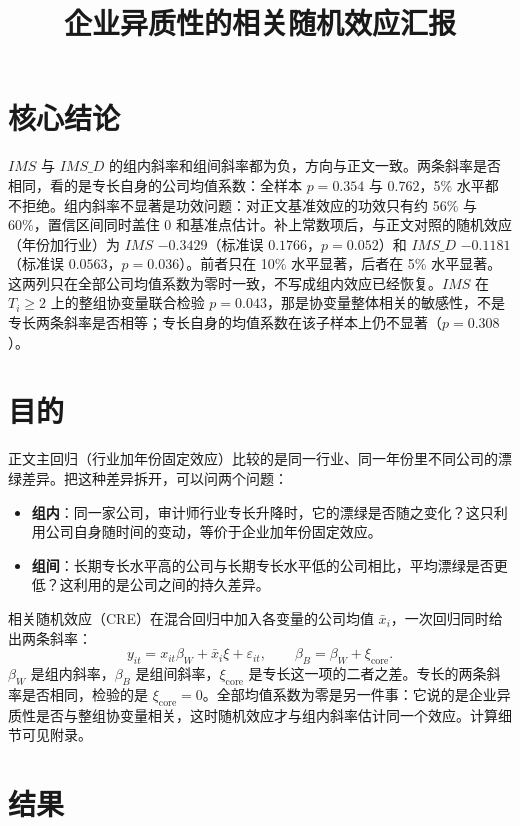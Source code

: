 \documentclass[12pt,a4paper]{article}
\title{企业异质性的相关随机效应汇报}
\author{}
\date{}
\begin{document}
\maketitle

\section{核心结论}

$IMS$ 与 $IMS\_D$ 的组内斜率和组间斜率都为负，方向与正文一致。两条斜率是否相同，看的是专长自身的公司均值系数：全样本 $p=0.354$ 与 $0.762$，5\% 水平都不拒绝。组内斜率不显著是功效问题：对正文基准效应的功效只有约 56\% 与 60\%，置信区间同时盖住 0 和基准点估计。补上常数项后，与正文对照的随机效应（年份加行业）为 $IMS$ $-0.3429$（标准误 $0.1766$，$p=0.052$）和 $IMS\_D$ $-0.1181$（标准误 $0.0563$，$p=0.036$）。前者只在 10\% 水平显著，后者在 5\% 水平显著。这两列只在全部公司均值系数为零时一致，不写成组内效应已经恢复。$IMS$ 在 $T_i\ge 2$ 上的整组协变量联合检验 $p=0.043$，那是协变量整体相关的敏感性，不是专长两条斜率是否相等；专长自身的均值系数在该子样本上仍不显著（$p=0.308$）。

\section{目的}

正文主回归（行业加年份固定效应）比较的是同一行业、同一年份里不同公司的漂绿差异。把这种差异拆开，可以问两个问题：
\begin{itemize}
\item \textbf{组内}：同一家公司，审计师行业专长升降时，它的漂绿是否随之变化？这只利用公司自身随时间的变动，等价于企业加年份固定效应。
\item \textbf{组间}：长期专长水平高的公司与长期专长水平低的公司相比，平均漂绿是否更低？这利用的是公司之间的持久差异。
\end{itemize}
相关随机效应（CRE）在混合回归中加入各变量的公司均值 $\bar x_i$，一次回归同时给出两条斜率：
\begin{equation}
y_{it}=x_{it}\beta_W+\bar x_i\xi+\varepsilon_{it},\qquad \beta_B=\beta_W+\xi_{\mathrm{core}}.
\end{equation}
$\beta_W$ 是组内斜率，$\beta_B$ 是组间斜率，$\xi_{\mathrm{core}}$ 是专长这一项的二者之差。专长的两条斜率是否相同，检验的是 $\xi_{\mathrm{core}}=0$。全部均值系数为零是另一件事：它说的是企业异质性是否与整组协变量相关，这时随机效应才与组内斜率估计同一个效应。计算细节可见附录。

\section{结果}
\end{document}
